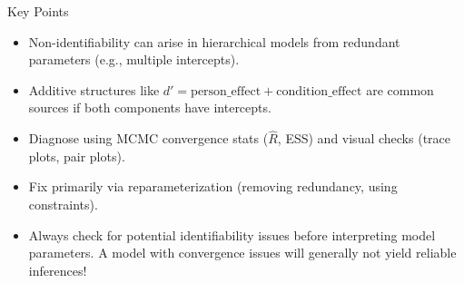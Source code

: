 \documentclass[aspectratio=169]{beamer}
\begin{document}
\begin{frame}{Key Points}
\begin{itemize}%
    \item Non-identifiability can arise in hierarchical models from redundant parameters (e.g., multiple intercepts). \pause
    \item Additive structures like $d' = \text{person\_effect} + \text{condition\_effect}$ are common sources if both components have intercepts. \pause
    \item Diagnose using MCMC convergence stats ($\hat{R}$, ESS) and visual checks (trace plots, pair plots). \pause
    \item Fix primarily via reparameterization (removing redundancy, using constraints). \pause
    \item Always check for potential identifiability issues before interpreting model parameters. A model with convergence issues will generally not yield reliable inferences!
\end{itemize}
\end{frame}

\maketitle
\end{document}
